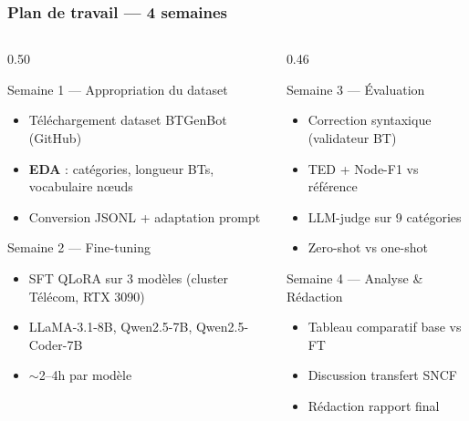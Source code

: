 \documentclass[aspectratio=169]{beamer}
\begin{document}
\begin{frame}
  \frametitle{Plan de travail — 4 semaines}

  {\scriptsize
  \begin{columns}[T]
    \begin{column}{0.50\textwidth}
      \begin{block}{Semaine 1 — Appropriation du dataset}
        \begin{itemize}\itemsep0pt
          \item Téléchargement dataset BTGenBot (GitHub)
          \item \textbf{EDA} : catégories, longueur BTs, vocabulaire nœuds
          \item Conversion JSONL + adaptation prompt
        \end{itemize}
      \end{block}

      \begin{block}{Semaine 2 — Fine-tuning}
        \begin{itemize}\itemsep0pt
          \item SFT QLoRA sur 3 modèles (cluster Télécom, RTX 3090)
          \item LLaMA-3.1-8B, Qwen2.5-7B, Qwen2.5-Coder-7B
          \item $\sim$2–4h par modèle
        \end{itemize}
      \end{block}
    \end{column}
    \begin{column}{0.46\textwidth}
      \begin{block}{Semaine 3 — Évaluation}
        \begin{itemize}\itemsep0pt
          \item Correction syntaxique (validateur BT)
          \item TED + Node-F1 vs référence
          \item LLM-judge sur 9 catégories
          \item Zero-shot vs one-shot
        \end{itemize}
      \end{block}

      \begin{block}{Semaine 4 — Analyse \& Rédaction}
        \begin{itemize}\itemsep0pt
          \item Tableau comparatif base vs FT
          \item Discussion transfert SNCF
          \item Rédaction rapport final
        \end{itemize}
      \end{block}
    \end{column}
  \end{columns}}
\end{frame}
\end{document}
